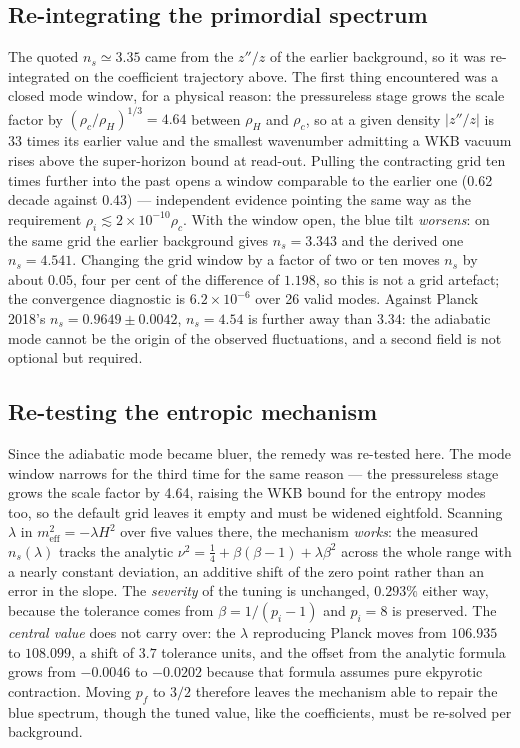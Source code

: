 \documentclass[a4paper,11pt]{article}
\begin{document}
\subsection{Re-integrating the primordial spectrum}
 The quoted $n_s\simeq3.35$ came from the $z''/z$ of the earlier background, so it was re-integrated on the coefficient trajectory above. The first thing encountered was a closed mode window, for a physical reason: the pressureless stage grows the scale factor by $(\rho_c/\rho_H)^{1/3}=4.64$ between $\rho_H$ and $\rho_c$, so at a given density $|z''/z|$ is 33 times its earlier value and the smallest wavenumber admitting a WKB vacuum rises above the super-horizon bound at read-out. Pulling the contracting grid ten times further into the past opens a window comparable to the earlier one (0.62 decade against 0.43) --- independent evidence pointing the same way as the requirement $\rho_i\lesssim2\times10^{-10}\rho_c$. With the window open, the blue tilt \emph{worsens}: on the same grid the earlier background gives $n_s=3.343$ and the derived one $n_s=4.541$. Changing the grid window by a factor of two or ten moves $n_s$ by about $0.05$, four per cent of the difference of $1.198$, so this is not a grid artefact; the convergence diagnostic is $6.2\times10^{-6}$ over 26 valid modes. Against Planck 2018's $n_s=0.9649\pm0.0042$, $n_s=4.54$ is further away than $3.34$: the adiabatic mode cannot be the origin of the observed fluctuations, and a second field is not optional but required.

\subsection{Re-testing the entropic mechanism}
 Since the adiabatic mode became bluer, the remedy was re-tested here. The mode window narrows for the third time for the same reason --- the pressureless stage grows the scale factor by 4.64, raising the WKB bound for the entropy modes too, so the default grid leaves it empty and must be widened eightfold. Scanning $\lambda$ in $m_{\mathrm{eff}}^2=-\lambda H^2$ over five values there, the mechanism \emph{works}: the measured $n_s(\lambda)$ tracks the analytic $\nu^2=\tfrac14+\beta(\beta-1)+\lambda\beta^2$ across the whole range with a nearly constant deviation, an additive shift of the zero point rather than an error in the slope. The \emph{severity} of the tuning is unchanged, $0.293\%$ either way, because the tolerance comes from $\beta=1/(p_i-1)$ and $p_i=8$ is preserved. The \emph{central value} does not carry over: the $\lambda$ reproducing Planck moves from $106.935$ to $108.099$, a shift of $3.7$ tolerance units, and the offset from the analytic formula grows from $-0.0046$ to $-0.0202$ because that formula assumes pure ekpyrotic contraction. Moving $p_f$ to $3/2$ therefore leaves the mechanism able to repair the blue spectrum, though the tuned value, like the coefficients, must be re-solved per background.
\end{document}
